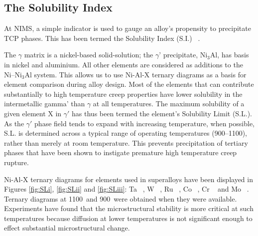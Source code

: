 
\subsection{The Solubility Index} 

At NIMS, a simple indicator is used to gauge an alloy’s propensity to precipitate TCP phases.  This has been termed the Solubility Index (S.I.) ~\cite{harada88}. 

The $\gamma$ matrix is a nickel-based solid-solution; the $\gamma$' precipitate, Ni$_3$Al, has basis in nickel and aluminium.  All other elements are considered as additions to the Ni--Ni$_3$Al system.  This allows us to use Ni-Al-X ternary diagrams as a basis for element comparison during alloy design.  Most of the elements that can contribute substantially to high temperature creep properties have lower solubility in the intermetallic gamma’ than $\gamma$ at all temperatures.  The maximum solubility of a given element X in $\gamma'$ has thus been termed the element's Solubility Limit (S.L.).  As the $\gamma'$ phase field tends to expand with increasing temperature, when possible, S.L. is determined across a typical range of operating temperatures (900--1100\celsius), rather than merely at room temperature.  This prevents precipitation of tertiary phases that have been shown to instigate premature high temperature creep rupture.  

Ni-Al-X ternary diagrams for elements used in superalloys have been displayed in Figures \ref{fig:SLi}, \ref{fig:SLii} and \ref{fig:SLiii}: Ta ~\cite{willemin86}, W ~\cite{alekseeva93}, Ru ~\cite{sokolovskaya85}, Co ~\cite{kainuma96}, Cr ~\cite{oforka85} and Mo ~\cite{kubaschewski93}.  Ternary diagrams at 1100\celsius\ and 900\celsius\ were obtained when they were available.  Experiments have found that the microstructural stability is more critical at such temperatures because diffusion at lower temperatures is not significant enough to effect substantial microstructural change.

